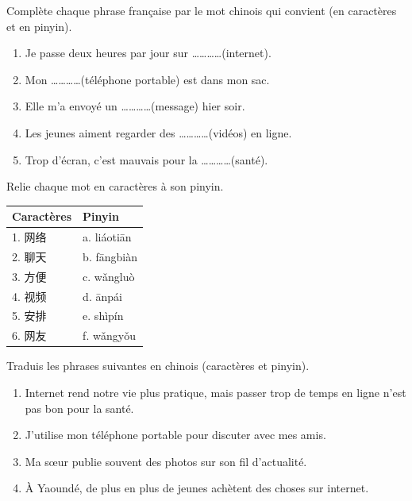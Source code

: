 \documentclass[11pt]{article}
\newcounter{popsec}
\newcounter{popsub}
\newcommand{\courssub}[1]{%
  \stepcounter{popsub}%
  \par\vspace{9pt}\noindent{\popxbold\fontsize{11.5}{13}\selectfont\color{popink}{\color{poporange}\thepopsec.\thepopsub}\hspace{6pt}#1}\par\nopagebreak\vspace{4pt}
}
\begin{document}
\begin{exercice}
Complète chaque phrase française par le mot chinois qui convient (en caractères et en pinyin).
\begin{enumerate}
\item Je passe deux heures par jour sur \ldots\ldots\ldots\ldots (internet).
\item Mon \ldots\ldots\ldots\ldots (téléphone portable) est dans mon sac.
\item Elle m'a envoyé un \ldots\ldots\ldots\ldots (message) hier soir.
\item Les jeunes aiment regarder des \ldots\ldots\ldots\ldots (vidéos) en ligne.
\item Trop d'écran, c'est mauvais pour la \ldots\ldots\ldots\ldots (santé).
\end{enumerate}
\end{exercice}

\begin{exercice}
Relie chaque mot en caractères à son pinyin.
\begin{center}
\begin{tabularx}{\linewidth}{|X|X|}
\hline
\rowcolor{popblueL} Caractères & Pinyin \\
\hline
1. 网络 & a. liáotiān \\
\hline
2. 聊天 & b. fāngbiàn \\
\hline
3. 方便 & c. wǎngluò \\
\hline
4. 视频 & d. ānpái \\
\hline
5. 安排 & e. shìpín \\
\hline
6. 网友 & f. wǎngyǒu \\
\hline
\end{tabularx}
\end{center}
\end{exercice}

\courssub{Je m'entraîne}

\begin{exercice}
Traduis les phrases suivantes en chinois (caractères et pinyin).
\begin{enumerate}
\item Internet rend notre vie plus pratique, mais passer trop de temps en ligne n'est pas bon pour la santé.
\item J'utilise mon téléphone portable pour discuter avec mes amis.
\item Ma sœur publie souvent des photos sur son fil d'actualité.
\item À Yaoundé, de plus en plus de jeunes achètent des choses sur internet.
\end{enumerate}
\end{exercice}
\end{document}
